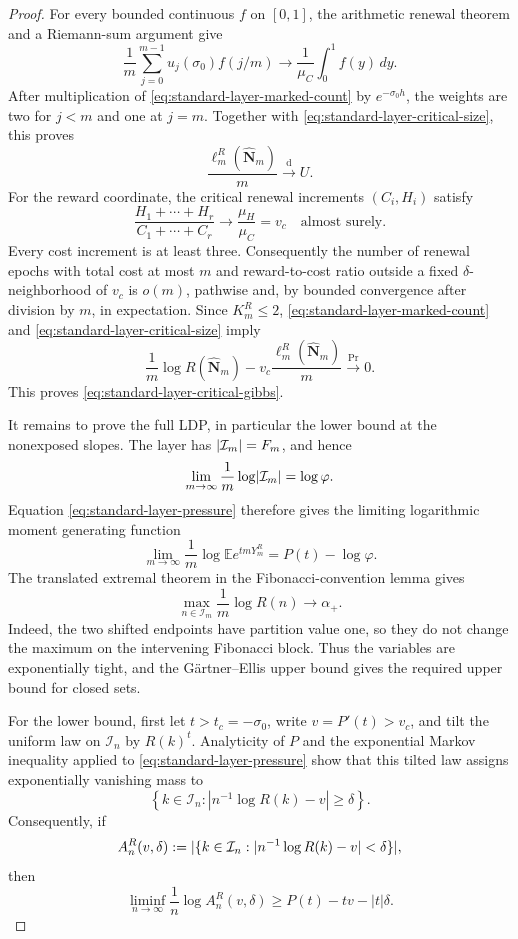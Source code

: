 \begin{proof}
For every bounded continuous \(f\) on \([0,1]\), the arithmetic renewal
theorem and a Riemann-sum argument give
\[
 \frac1m\sum_{j=0}^{m-1}u_j(\sigma_0)f(j/m)
 \longrightarrow\frac1{\mu_C}\int_0^1f(y)\,dy.
\]
After multiplication of \eqref{eq:standard-layer-marked-count} by
\(e^{-\sigma_0h}\), the weights are two for \(j<m\) and one at \(j=m\).
Together with \eqref{eq:standard-layer-critical-size}, this proves
\[
 \frac{\ell_m^R(\widehat{\mathbf N}_m)}m
 \xrightarrow{\mathrm d}U.
\]
For the reward coordinate, the critical renewal increments
\((C_i,H_i)\) satisfy
\[
 \frac{H_1+\cdots+H_r}{C_1+\cdots+C_r}
 \longrightarrow\frac{\mu_H}{\mu_C}=v_c
\quad\text{almost surely}.
\]
Every cost increment is at least three.  Consequently the number of renewal
epochs with total cost at most \(m\) and reward-to-cost ratio outside a fixed
\(\delta\)-neighborhood of \(v_c\) is \(o(m)\), pathwise and, by bounded
convergence after division by \(m\), in expectation.  Since \(K_m^R\le2\),
\eqref{eq:standard-layer-marked-count} and
\eqref{eq:standard-layer-critical-size} imply
\[
 \frac1m\log R(\widehat{\mathbf N}_m)
 -v_c\frac{\ell_m^R(\widehat{\mathbf N}_m)}m
 \xrightarrow{\Pr}0.
\]
This proves \eqref{eq:standard-layer-critical-gibbs}.

It remains to prove the full LDP, in particular the lower bound at the
nonexposed slopes.  The layer has
\(\lvert \mathcal I_m \rvert=F_m\), and hence
\[
 \lim_{m\to\infty}\frac1m\log\lvert \mathcal I_m \rvert=\log\varphi.
\]
Equation \eqref{eq:standard-layer-pressure} therefore gives the limiting
logarithmic moment generating function
\[
 \lim_{m\to\infty}\frac1m
 \log\mathbb E e^{tmY_m^R}=P(t)-\log\varphi.
 \label{eq:standard-layer-log-mgf}
\]
The translated extremal theorem in the Fibonacci-convention lemma gives
\[
 \max_{n\in\mathcal I_m}\frac1m\log R(n)
 \longrightarrow\alpha_+.
 \label{eq:standard-layer-maximum}
\]
Indeed, the two shifted endpoints have partition value one, so they do not
change the maximum on the intervening Fibonacci block.  Thus the variables
are exponentially tight, and the G\"artner--Ellis upper bound gives the
required upper bound for closed sets.

For the lower bound, first let \(t>t_c=-\sigma_0\), write
\(v=P'(t)>v_c\), and
tilt the uniform law on \(\mathcal I_n\) by \(R(k)^t\).  Analyticity of \(P\)
and the exponential Markov inequality applied to
\eqref{eq:standard-layer-pressure} show that this tilted law assigns
exponentially vanishing mass to
\[
 \left\{k\in\mathcal I_n:
   \left|n^{-1}\log R(k)-v\right|\ge\delta\right\}.
\]
Consequently, if
\[
 A_n^R(v,\delta)
 :=\lvert \{k\in\mathcal I_n:
 |n^{-1}\log R(k)-v|<\delta\} \rvert,
\]
then
\begin{equation}
 \liminf_{n\to\infty}\frac1n\log A_n^R(v,\delta)
 \ge P(t)-tv-|t|\delta.
 \label{eq:standard-layer-exposed-source}
\end{equation}


\end{proof}

